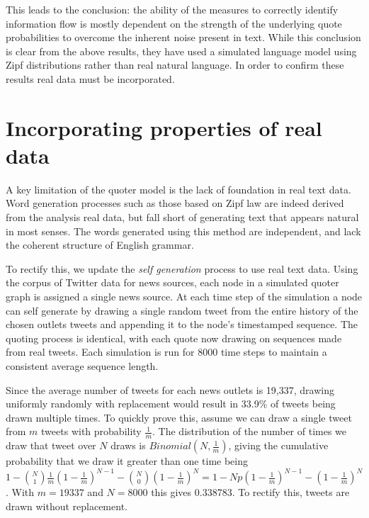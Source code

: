 This leads to the conclusion: the ability of the measures to correctly identify information flow is mostly dependent on the strength of the underlying quote probabilities to overcome the inherent noise present in text. While this conclusion is clear from the above results, they have used a simulated language model using Zipf distributions rather than real natural language. In order to confirm these results real data must be incorporated.


\section{Incorporating properties of real data}
A key limitation of the quoter model is the lack of foundation in real text data. Word generation processes such as those based on Zipf law are indeed derived from the analysis real data, but fall short of generating text that appears natural in most senses. The words generated using this method are independent, and lack the coherent structure of English grammar.

To rectify this, we update the \emph{self generation} process to use real text data. Using the corpus of Twitter data for news sources, each node in a simulated quoter graph is assigned a single news source. At each time step of the simulation a node can self generate by drawing a single random tweet from the entire history of the chosen outlets tweets and appending it to the node's timestamped sequence. The quoting process is identical, with each quote now drawing on sequences made from real tweets. Each simulation is run for 8000 time steps to maintain a consistent average sequence length. 

Since the average number of tweets for each news outlets is 19,337, drawing uniformly randomly with replacement would result in 33.9\% of tweets being drawn multiple times. To quickly prove this, assume we can draw a single tweet from $m$ tweets with probability $\frac{1}{m}$. The distribution of the number of times we draw that tweet over $N$ draws is $Binomial(N, \frac{1}{m})$, giving the cumulative probability that we draw it greater than one time being $1-\binom{N}{1} \frac{1}{m}(1-\frac{1}{m})^{N-1} - \binom{N}{0} (1-\frac{1}{m})^N = 1- Np(1-\frac{1}{m})^{N-1} - (1-\frac{1}{m})^N$. With $m=19337$ and $N=8000$ this gives 0.338783. To rectify this, tweets are drawn without replacement. 


